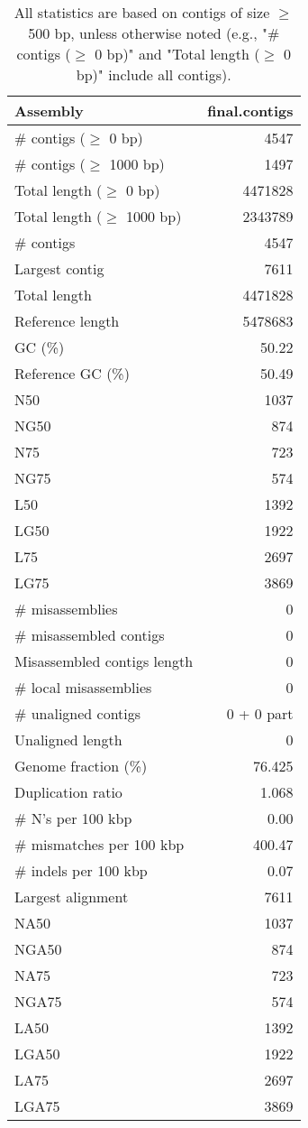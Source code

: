 \documentclass[12pt,a4paper]{article}
\begin{document}
\begin{table}[ht]
\begin{center}
\caption{All statistics are based on contigs of size $\geq$ 500 bp, unless otherwise noted (e.g., "\# contigs ($\geq$ 0 bp)" and "Total length ($\geq$ 0 bp)" include all contigs).}
\begin{tabular}{|l*{1}{|r}|}
\hline
Assembly & final.contigs \\ \hline
\# contigs ($\geq$ 0 bp) & 4547 \\ \hline
\# contigs ($\geq$ 1000 bp) & 1497 \\ \hline
Total length ($\geq$ 0 bp) & 4471828 \\ \hline
Total length ($\geq$ 1000 bp) & 2343789 \\ \hline
\# contigs & 4547 \\ \hline
Largest contig & 7611 \\ \hline
Total length & 4471828 \\ \hline
Reference length & 5478683 \\ \hline
GC (\%) & 50.22 \\ \hline
Reference GC (\%) & 50.49 \\ \hline
N50 & 1037 \\ \hline
NG50 & 874 \\ \hline
N75 & 723 \\ \hline
NG75 & 574 \\ \hline
L50 & 1392 \\ \hline
LG50 & 1922 \\ \hline
L75 & 2697 \\ \hline
LG75 & 3869 \\ \hline
\# misassemblies & 0 \\ \hline
\# misassembled contigs & 0 \\ \hline
Misassembled contigs length & 0 \\ \hline
\# local misassemblies & 0 \\ \hline
\# unaligned contigs & 0 + 0 part \\ \hline
Unaligned length & 0 \\ \hline
Genome fraction (\%) & 76.425 \\ \hline
Duplication ratio & 1.068 \\ \hline
\# N's per 100 kbp & 0.00 \\ \hline
\# mismatches per 100 kbp & 400.47 \\ \hline
\# indels per 100 kbp & 0.07 \\ \hline
Largest alignment & 7611 \\ \hline
NA50 & 1037 \\ \hline
NGA50 & 874 \\ \hline
NA75 & 723 \\ \hline
NGA75 & 574 \\ \hline
LA50 & 1392 \\ \hline
LGA50 & 1922 \\ \hline
LA75 & 2697 \\ \hline
LGA75 & 3869 \\ \hline
\end{tabular}
\end{center}
\end{table}
\end{document}
